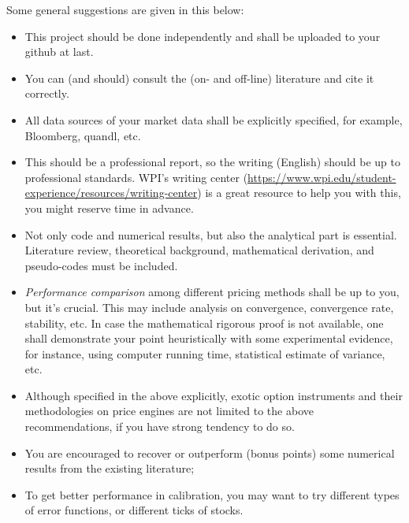 \documentclass{article}
\begin{document}
Some general suggestions are given in this below:
\begin{itemize}
\item 
This project should be done independently and shall be uploaded to your github at last.

\item You can (and should)  consult the (on- and off-line) literature and cite it correctly.

\item All data sources of your market data shall be explicitly specified, for example, 
Bloomberg,  quandl, etc.

\item This should be a professional report, so the writing (English) should be up to professional standards. WPI's writing center (\url{https://www.wpi.edu/student-experience/resources/writing-center}) is a great resource to help you with this, you might reserve time in advance. 

\item
Not only code and numerical results, but also the analytical part is essential.
Literature review, theoretical background, 
mathematical derivation, and pseudo-codes must be included. 

\item {\it Performance comparison} among different pricing methods shall be up to you, but it's crucial.
This may include analysis on convergence, convergence rate, stability, etc. 
In case the mathematical rigorous proof is not available, 
 one shall demonstrate your point heuristically with some experimental evidence, 
 for instance, using computer running time, statistical estimate of variance, etc.


 \item Although specified in the above explicitly, 
 exotic option instruments and their methodologies on price engines are not limited to the above 
 recommendations, 
 if you have strong tendency to do so.
 
  
 \item You are encouraged to recover or outperform (bonus points) some numerical results from the existing literature;
 
 \item To get better performance in calibration, you
may want to try different types of error functions, or different ticks of stocks. 


\end{itemize}
\end{document}
